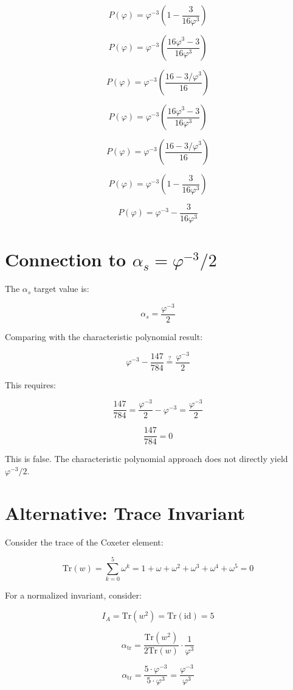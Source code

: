 \documentclass{article}
\begin{document}
\[
P(\varphi) = \varphi^{-3} \left(1 - \frac{3}{16\varphi^3}\right)
\]

\[
P(\varphi) = \varphi^{-3}\left(\frac{16\varphi^3 - 3}{16\varphi^3}\right)
\]

\[
P(\varphi) = \varphi^{-3}\left(\frac{16 - 3/\varphi^3}{16}\right)
\]

\[
P(\varphi) = \varphi^{-3}\left(\frac{16\varphi^3 - 3}{16\varphi^3}\right)
\]

\[
P(\varphi) = \varphi^{-3}\left(\frac{16 - 3/\varphi^3}{16}\right)
\]

\[
P(\varphi) = \varphi^{-3}\left(1 - \frac{3}{16\varphi^3}\right)
\]

\[
P(\varphi) = \varphi^{-3} - \frac{3}{16\varphi^3}
\]

\section{Connection to $\alpha_s = \varphi^{-3}/2$}

The $\alpha_s$ target value is:

\[
\alpha_s = \frac{\varphi^{-3}}{2}
\]

Comparing with the characteristic polynomial result:

\[
\varphi^{-3} - \frac{147}{784} \stackrel{?}{=} \frac{\varphi^{-3}}{2}
\]

This requires:

\[
\frac{147}{784} = \frac{\varphi^{-3}}{2} - \varphi^{-3} = \frac{\varphi^{-3}}{2}
\]

\[
\frac{147}{784} = 0
\]

This is false. The characteristic polynomial approach does not directly yield $\varphi^{-3}/2$.

\section{Alternative: Trace Invariant}

Consider the trace of the Coxeter element:

\[
\text{Tr}(w) = \sum_{k=0}^{5} \omega^k = 1 + \omega + \omega^2 + \omega^3 + \omega^4 + \omega^5 = 0
\]

For a normalized invariant, consider:

\[
I_A = \text{Tr}(w^2) = \text{Tr}(\text{id}) = 5
\]

\[
\alpha_{\text{tr}} = \frac{\text{Tr}(w^2)}{2\text{Tr}(w)} \cdot \frac{1}{\varphi^3}
\]

\[
\alpha_{\text{tr}} = \frac{5 \cdot \varphi^{-3}}{5 \cdot \varphi^3} = \frac{\varphi^{-3}}{\varphi^3}
\]
\end{document}

